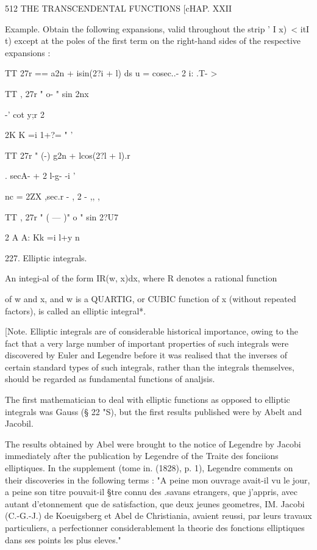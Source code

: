 512 THE TRANSCENDENTAL FUNCTIONS [cHAP. XXII

Example. Obtain the following expansions, valid throughout the strip '
I x)\ < itI t) except at the poles of the first term on the right-hand
sides of the respective expansions :

TT 27r == a2n + isin(2?i + l) ds u = cosec..- 2 i: .T- >

TT , 27r " o- " sin 2nx

-' cot y;r 2

2K K =i 1+?= " '

TT 27r " (-) g2n + lcos(2?l + l).r

 . secA- + 2 l-g- -i '

nc = 2ZX ,sec.r - , 2 - ,, ,

TT , 27r " ( — )" o " sin 2?U7

2 A A: Kk =i l+y n

227. Elliptic integrals.

An integi-al of the form IR(w, x)dx, where R denotes a rational
function

of w and x, and w is a QUARTIG, or CUBIC function of x (without
repeated factors), is called an elliptic integral*.

[Note. Elliptic integrals are of considerable historical importance,
owing to the fact that a very large number of important properties of
such integrals were discovered by Euler and Legendre before it was
realised that the inverses of certain standard types of such
integrals, rather than the integrals themselves, should be regarded as
fundamental functions of analjsis.

The first mathematician to deal with elliptic functions as opposed to
elliptic integrals was Gauss (§ 22 "S), but the first results
published were by Abelt and Jacobil.

The results obtained by Abel were brought to the notice of Legendre by
Jacobi immediately after the publication by Legendre of the Traite des
fonciions elliptiques. In the supplement (tome in. (1828), p. 1),
Legendre comments on their discoveries in the following terms : "A
peine mon ouvrage avait-il vu le jour, a peine son titre pouvait-il
§tre connu des .savans etrangers, que j'appris, avec autant
d'etonnement que de satisfaction, que deux jeunes geometres, IM.
Jacobi (C.-G.-J.) de Koeuigsberg et Abel de Christiania, avaient
reussi, par leurs travaux particuliers, a perfectionner
considerablement la theorie des fonctions elliptiques dans ses points
les plus eleves."

